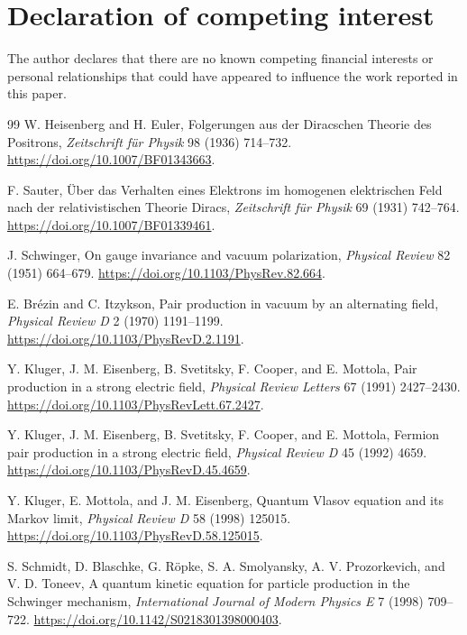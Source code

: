 \documentclass[anonymous]{iopjournal}
\begin{document}
\section*{Declaration of competing interest}
The author declares that there are no known competing financial interests or personal relationships that could have appeared to influence the work reported in this paper.

\FloatBarrier
\begin{thebibliography}{99}
W. Heisenberg and H. Euler, Folgerungen aus der Diracschen Theorie des Positrons, \textit{Zeitschrift f\"ur Physik} 98 (1936) 714--732. \url{https://doi.org/10.1007/BF01343663}.

F. Sauter, \"Uber das Verhalten eines Elektrons im homogenen elektrischen Feld nach der relativistischen Theorie Diracs, \textit{Zeitschrift f\"ur Physik} 69 (1931) 742--764. \url{https://doi.org/10.1007/BF01339461}.

J. Schwinger, On gauge invariance and vacuum polarization, \textit{Physical Review} 82 (1951) 664--679. \url{https://doi.org/10.1103/PhysRev.82.664}.

E. Br\'ezin and C. Itzykson, Pair production in vacuum by an alternating field, \textit{Physical Review D} 2 (1970) 1191--1199. \url{https://doi.org/10.1103/PhysRevD.2.1191}.

Y. Kluger, J. M. Eisenberg, B. Svetitsky, F. Cooper, and E. Mottola, Pair production in a strong electric field, \textit{Physical Review Letters} 67 (1991) 2427--2430. \url{https://doi.org/10.1103/PhysRevLett.67.2427}.

Y. Kluger, J. M. Eisenberg, B. Svetitsky, F. Cooper, and E. Mottola, Fermion pair production in a strong electric field, \textit{Physical Review D} 45 (1992) 4659. \url{https://doi.org/10.1103/PhysRevD.45.4659}.

Y. Kluger, E. Mottola, and J. M. Eisenberg, Quantum Vlasov equation and its Markov limit, \textit{Physical Review D} 58 (1998) 125015. \url{https://doi.org/10.1103/PhysRevD.58.125015}.

S. Schmidt, D. Blaschke, G. R\"opke, S. A. Smolyansky, A. V. Prozorkevich, and V. D. Toneev, A quantum kinetic equation for particle production in the Schwinger mechanism, \textit{International Journal of Modern Physics E} 7 (1998) 709--722. \url{https://doi.org/10.1142/S0218301398000403}.


\end{thebibliography}
\end{document}
